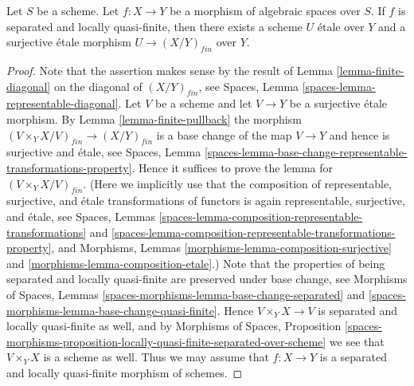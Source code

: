 %
\begin{lemma}
\label{lemma-finite-surjective-etale-cover}
Let $S$ be a scheme.
Let $f : X \to Y$ be a morphism of algebraic spaces over $S$.
If $f$ is separated and locally quasi-finite, then there exists a
scheme $U$ \'etale over $Y$ and a surjective \'etale morphism
$U \to (X/Y)_{fin}$ over $Y$.
\end{lemma}

\begin{proof}
Note that the assertion makes sense by the result of
Lemma \ref{lemma-finite-diagonal}
on the diagonal of $(X/Y)_{fin}$, see
Spaces, Lemma \ref{spaces-lemma-representable-diagonal}.
Let $V$ be a scheme and let $V \to Y$ be a surjective \'etale morphism. By
Lemma \ref{lemma-finite-pullback}
the morphism $(V \times_Y X/V)_{fin} \to (X/Y)_{fin}$ is
a base change of the map $V \to Y$ and hence is surjective and \'etale, see
Spaces,
Lemma \ref{spaces-lemma-base-change-representable-transformations-property}.
Hence it suffices to prove the lemma for $(V \times_Y X/V)_{fin}$.
(Here we implicitly use that the composition of representable, surjective, and
\'etale transformations of functors is again representable, surjective, and
\'etale, see
Spaces, Lemmas \ref{spaces-lemma-composition-representable-transformations} and
\ref{spaces-lemma-composition-representable-transformations-property}, and
Morphisms, Lemmas \ref{morphisms-lemma-composition-surjective} and
\ref{morphisms-lemma-composition-etale}.)
Note that the properties of being separated and locally quasi-finite
are preserved under base change, see
Morphisms of Spaces,
Lemmas \ref{spaces-morphisms-lemma-base-change-separated} and
\ref{spaces-morphisms-lemma-base-change-quasi-finite}.
Hence $V \times_Y X \to V$ is separated and locally quasi-finite as well,
and by
Morphisms of Spaces, Proposition
\ref{spaces-morphisms-proposition-locally-quasi-finite-separated-over-scheme}
we see that $V \times_Y X$ is a scheme as well.
Thus we may assume that $f : X \to Y$ is a separated and locally quasi-finite
morphism of schemes.


\end{proof}
